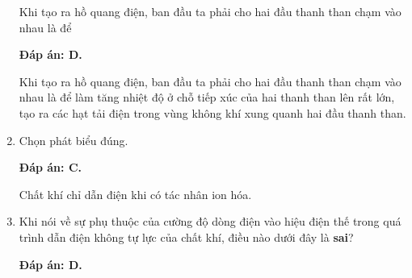 \begin{enumerate}[label=\bfseries Câu \arabic*:]
	\cauhoi
	{Khi tạo ra hồ quang điện, ban đầu ta phải cho hai đầu thanh than chạm vào nhau là để
		
	}
	\loigiai
	{	\textbf{Đáp án: D.}
		
		Khi tạo ra hồ quang điện, ban đầu ta phải cho hai đầu thanh than chạm vào nhau là để làm tăng nhiệt độ ở chỗ tiếp xúc của hai thanh than lên rất lớn, tạo ra các hạt tải điện trong vùng không khí xung quanh hai đầu thanh than.
	}
	\item {}
	
	\cauhoi
	{Chọn phát biểu đúng.
		
	}
	\loigiai
	{	\textbf{Đáp án: C.}
		
		Chất khí chỉ dẫn điện khi có tác nhân ion hóa.
	}
	\item {}
	
	\cauhoi
	{Khi nói về sự phụ thuộc của cường độ dòng điện vào hiệu điện thế trong quá trình dẫn điện không tự lực của chất khí, điều nào dưới đây là \textbf{sai}?
		
	}
	\loigiai
	{	\textbf{Đáp án: D.}
		
}
\end{enumerate}
